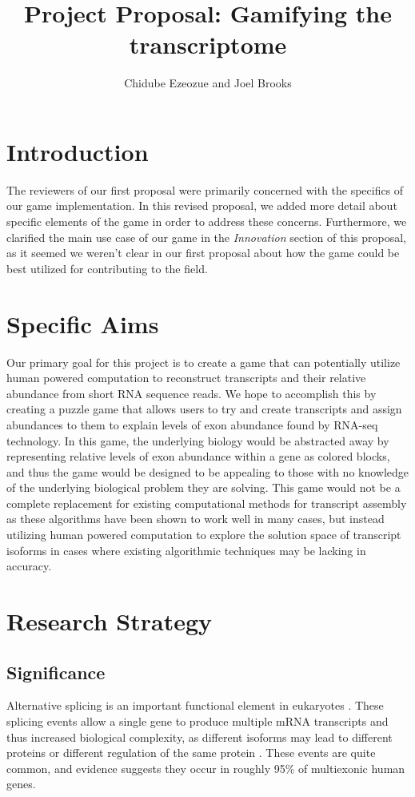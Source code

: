 \documentclass[12pt]{article}
\title{Project Proposal: Gamifying the transcriptome}
\author{Chidube Ezeozue and Joel Brooks}
\begin{document}

\renewcommand\refname{Bibliography}
\maketitle

\section*{Introduction}
The reviewers of our first proposal were primarily concerned with the specifics of our game implementation. In this revised proposal, we added more detail about specific elements of the game in order to address these concerns.
Furthermore, we clarified the main use case of our game in the \emph{Innovation} section of this proposal, as it seemed we weren't clear in our first proposal about how the game could be best utilized for contributing to the field.

\section*{Specific Aims}
Our primary goal for this project is to create a game that can potentially utilize human powered computation to reconstruct transcripts and their relative abundance from short RNA sequence reads. We hope to accomplish this by creating a puzzle game that allows users to try and create transcripts and assign abundances to them to explain levels of exon abundance found by RNA-seq technology. In this game, the underlying biology would be abstracted away by representing relative levels of exon abundance within a gene as colored blocks, and thus the game would be designed to be appealing to those with no knowledge of the underlying biological problem they are solving. This game would not be a complete replacement for existing computational methods for transcript assembly as these algorithms have been shown to work well in many cases, but instead utilizing human powered computation to explore the solution space of transcript isoforms in cases where existing algorithmic techniques may be lacking in accuracy.

\section*{Research Strategy}

\subsection*{Significance}
Alternative splicing is an important functional element in eukaryotes \citep{pan2008deep}. These splicing events allow a single gene to produce multiple mRNA transcripts and thus increased biological complexity, as different isoforms may lead to different proteins or different regulation of the same protein \citep{trapnell2010transcript}. These events are quite common, and evidence suggests they occur in roughly 95\% of multiexonic human genes.
\end{document}
